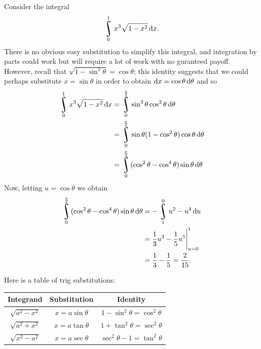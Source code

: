 


Consider the integral
\begin{displaymath}
  \rint^1_0 x^3 \sqrt{1-x^2} \dif{x}.
\end{displaymath}
There is no obvious easy substitution to simplify this integral, and integration by parts could work but will require
a lot of work with no guranteed payoff. However, recall that $ \sqrt{1 - \sin^2 \theta} = \cos \theta $; this identity
suggests that we could perhaps substitute $ x = \sin \theta $ in order to obtain $ \dif{x} = \cos \theta \dif{\theta} $ and so
\begin{align*}
  \rint^1_0 x^3 \sqrt{1-x^2} \dif{x} &= \rint^{\frac{\pi}{2}}_0 \sin^3 \theta \cos^2 \theta \dif{\theta}\\
                                     &= \rint^{\frac{\pi}{2}}_0 \sin \theta (1-\cos^2 \theta)\cos \theta \dif{\theta}\\
                                     &= \rint^{\frac{\pi}{2}}_0 (\cos^2 \theta - \cos^4 \theta) \sin \theta \dif{\theta}
\end{align*}
Now, letting $ u = \cos \theta $ we obtain
\begin{align*}
  \rint^{\frac{\pi}{2}}_0 (\cos^2 \theta - \cos^4 \theta) \sin \theta \dif{\theta} &= -\rint^{0}_{1} u^2 - u^4 \dif{u}\\
                                                                                   &= \eval{\frac{1}{3}u^3 - \frac{1}{5}u^5}_{u = 0}^{1}\\
                                                                                   &= \frac{1}{3}-\frac{1}{5} = \frac{2}{15}.
\end{align*}

Here is a table of trig substitutions:

\begin{center}
  \def\arraystretch{1.5}
  \begin{tabular}{|c|c|c|}\hline
    \textbf{Integrand} & \textbf{Substitution} & \textbf{Identity}\\\hline
    $ \sqrt{a^2 - x^2} $ & $ x = a \sin \theta $ & $ 1 - \sin^2 \theta = \cos^2 \theta $\\\hline
    $ \sqrt{a^2 + x^2} $ & $ x = a \tan \theta $ & $ 1 + \tan^2 \theta = \sec^2 \theta $\\\hline
    $ \sqrt{x^2 - a^2} $ & $ x = a \sec \theta $ & $ \sec^2 \theta - 1 = \tan^2 \theta $\\\hline
  \end{tabular}
\end{center}


